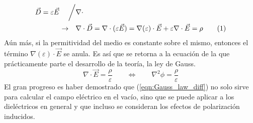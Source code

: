 \documentclass[12pt, oneside, numbers, spanish]{ezthesis}
\newcommand\numberthis{\addtocounter{equation}{1}\tag{\theequation}}
\numberwithin{equation}{section}
\begin{document}
\begin{align*}
\vec{D} = \varepsilon\vec{E}\quad\biggm/&\nabla\cdot\\
\rightarrow\quad&\nabla\cdot\vec{D}=\nabla\cdot(\varepsilon\vec{E}) = \nabla(\varepsilon)\cdot\vec{E} + \varepsilon\nabla\cdot\vec{E} = \rho \numberthis
\end{align*}
Aún más, si la permitividad del medio es constante sobre el mismo, entonces el término $\nabla (\varepsilon)\cdot\vec{E}$ se anula. Es así que se retorna a la ecuación de la que prácticamente parte el desarrollo de la teoría, la ley de Gauss.
\begin{equation}
\nabla\cdot\vec{E} = \frac{\rho}{\varepsilon} \qquad \iff \qquad \nabla^2\phi = \frac{\rho}{\varepsilon} \label{eqn:Laplace_potential}
\end{equation}
El gran progreso es haber demostrado que (\ref{eqn:Gauss_law_diff}) no solo sirve para calcular el campo eléctrico en el vacío, sino que se puede aplicar a los dieléctricos en general y que incluso se consideran los efectos de polarización inducidos.
\end{document}
